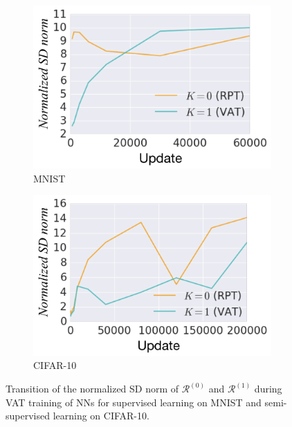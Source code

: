 \documentclass[10pt,journal,compsoc]{IEEEtran}
\begin{document}
\begin{figure}
	\centering
    \begin{subfigure}{0.24\textwidth}
 	\includegraphics[width=\textwidth]{mnist/std_e.pdf}
	\caption{\label{fig:mnist_std_e}MNIST}
    \end{subfigure}
    \begin{subfigure}{0.24\textwidth}
	\includegraphics[width=\textwidth]{cifar10/std_e.pdf}
	\caption{\label{fig:cifar10_std_e}CIFAR-10}
    \end{subfigure}
	\caption{\label{fig:std_e}Transition of the normalized SD norm of $\mathcal{R}^{(0)}$ and $\mathcal{R}^{(1)}$ during VAT training of NNs for supervised learning on MNIST and semi-supervised learning on CIFAR-10. }
\end{figure}
\end{document}
